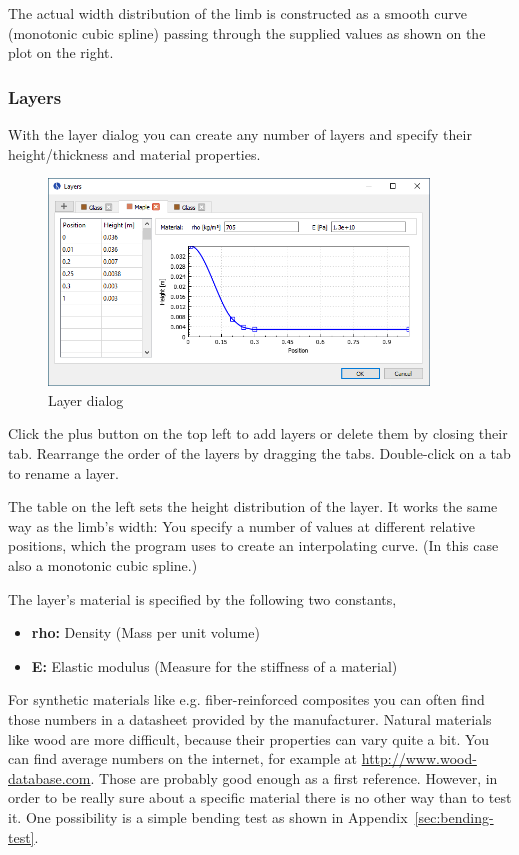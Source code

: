 \documentclass[12pt]{article}
\begin{document}
The actual width distribution of the limb is constructed as a smooth curve (monotonic cubic spline) passing through the supplied values as shown on the plot on the right.

\newpage
\subsubsection{Layers}

With the layer dialog you can create any number of layers and specify their height/thickness and material properties.
\bigskip

\begin{figure}[H]
\centering
\includegraphics[width=0.9\textwidth]{figures/screenshots/input/layers}
\caption{Layer dialog}
\label{fig:width}
\end{figure}

Click the plus button on the top left to add layers or delete them by closing their tab.
Rearrange the order of the layers by dragging the tabs.
Double-click on a tab to rename a layer.

The table on the left sets the height distribution of the layer. It works the same way as the limb's width: You specify a number of values at different relative positions, which the program uses to create an interpolating curve. (In this case also a monotonic cubic spline.)

The layer's material is specified by the following two constants,

\begin{itemize}
\item \textbf{rho:} Density (Mass per unit volume)
\item \textbf{E:} Elastic modulus (Measure for the stiffness of a material)
\end{itemize}

For synthetic materials like e.g. fiber-reinforced composites you can often find those numbers in a datasheet provided by the manufacturer.
Natural materials like wood are more difficult, because their properties can vary quite a bit.
You can find average numbers on the internet, for example at \url{http://www.wood-database.com}.
Those are probably good enough as a first reference.
However, in order to be really sure about a specific material there is no other way than to test it.
One possibility is a simple bending test as shown in Appendix~\ref{sec:bending-test}.
\end{document}
